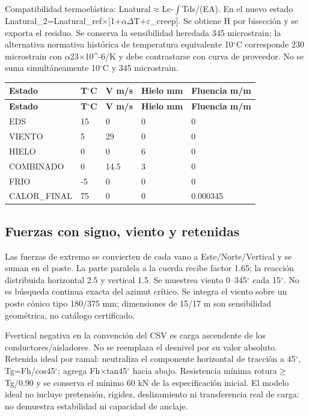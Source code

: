 Compatibilidad termoelástica: Lnatural\ensuremath{\approx}Lc-\ensuremath{\int}Tds/(EA). En el nuevo estado Lnatural\_\allowbreak{}2=Lnatural\_\allowbreak{}ref\ensuremath{\times}[1+\ensuremath{\alpha}\ensuremath{\Delta}T+\ensuremath{\varepsilon}\_\allowbreak{}creep]. Se obtiene H por bisección y se exporta el residuo. Se conserva la sensibilidad heredada 345 microstrain; la alternativa normativa histórica de temperatura equivalente 10\ensuremath{^\circ}C corresponde 230 microstrain con \ensuremath{\alpha}23\ensuremath{\times}10\textasciicircum{}-6/K y debe contrastarse con curva de proveedor. No se suma simultáneamente 10\ensuremath{^\circ}C y 345 microstrain.

\begingroup\small\setlength{\LTpre}{4pt}\setlength{\LTpost}{6pt}
\begin{longtable}{*{5}{L{\dimexpr\linewidth/5-2\tabcolsep\relax}}}
\toprule
\textbf{Estado} & \textbf{T\ensuremath{^\circ}C} & \textbf{V m/s} & \textbf{Hielo mm} & \textbf{Fluencia m/m} \\ \midrule
\endfirsthead
\toprule
\textbf{Estado} & \textbf{T\ensuremath{^\circ}C} & \textbf{V m/s} & \textbf{Hielo mm} & \textbf{Fluencia m/m} \\ \midrule
\endhead
EDS & 15 & 0 & 0 & 0 \\
VIENTO & 5 & 29 & 0 & 0 \\
HIELO & 0 & 0 & 6 & 0 \\
COMBINADO & 0 & 14.5 & 3 & 0 \\
FRIO & -5 & 0 & 0 & 0 \\
CALOR\_\allowbreak{}FINAL & 75 & 0 & 0 & 0.000345 \\
\bottomrule\end{longtable}\endgroup

\setcounter{subsection}{3}
\subsection{Fuerzas con signo, viento y retenidas}
Las fuerzas de extremo se convierten de cada vano a Este/Norte/Vertical y se suman en el poste. La parte paralela a la cuerda recibe factor 1.65; la reacción distribuida horizontal 2.5 y vertical 1.5. Se muestrea viento 0--345\ensuremath{^\circ} cada 15\ensuremath{^\circ}. No es búsqueda continua exacta del azimut crítico. Se integra el viento sobre un poste cónico tipo 180/375 mm; dimensiones de 15/17 m son sensibilidad geométrica, no catálogo certificado.

Fvertical negativa en la convención del CSV es carga ascendente de los conductores/aisladores. No se reemplaza el desnivel por su valor absoluto. Retenida ideal por ramal: neutraliza el componente horizontal de tracción a 45\ensuremath{^\circ}, Tg=Fh/cos45\ensuremath{^\circ}; agrega Fh\ensuremath{\times}tan45\ensuremath{^\circ} hacia abajo. Resistencia mínima rotura\ensuremath{\geq}Tg/0.90 y se conserva el mínimo 60 kN de la especificación inicial. El modelo ideal no incluye pretensión, rigidez, deslizamiento ni transferencia real de carga: no demuestra estabilidad ni capacidad de anclaje.

